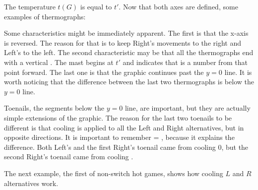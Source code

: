 The temperature $t(G)$ is equal to $t'$. Now that both axes are defined, some examples of thermographs:



Some characteristics might be immediately apparent. The first is that the x-axis is reversed. The reason for that is to keep Right's movements to the right and Left's to the left. The second characteristic may be that all the thermographs end with a vertical . The mast begins at $t'$ and indicates that \Gm{} is a number from that point forward. The last one is that the graphic continues past the $y=0$ line. It is worth noticing that the difference between the last two thermographs is below the $y=0$ line.

Toenails, the segments below the $y=0$ line, are important, but they are actually simple extensions of the graphic. The reason for the last two toenails to be different is that cooling is applied to all the Left and Right alternatives, but in opposite directions. It is important to remember  = , because it explains the difference. Both Left's and the first Right's toenail came from cooling 0, but the second Right's toenail came from cooling .

The next example, the first of non-switch hot games, shows how cooling $L$ and $R$ alternatives work.\\
\begin{center}
\end{center}









